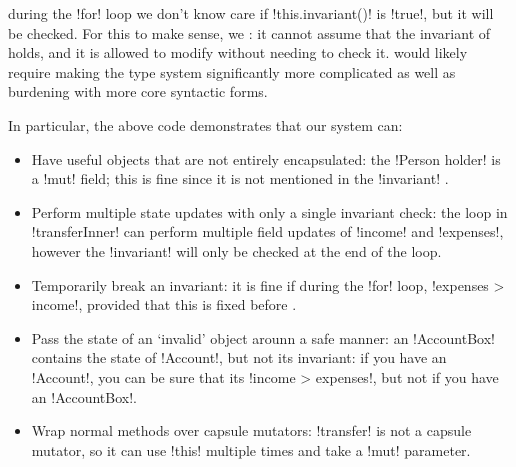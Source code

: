  during the \Q!for! loop\IO{)} we don't know  care if \Q!this.invariant()! is \Q!true!, but   it will be checked. For this to make sense, we  : it cannot assume that the invariant of   holds, and it is allowed to modify   without needing to check it.  would likely require making the type system significantly more complicated as well as burdening   with more core syntactic forms. 

 In particular, the above code demonstrates that our system can:
\SSI\begin{itemize}
\item Have useful objects that are not entirely encapsulated: the \Q!Person holder! is a \Q!mut! field; this is fine since it is not mentioned in the  \Q!invariant! .
\item Perform multiple state updates with only a single invariant check: the loop in \Q!transferInner!  can perform multiple field updates of \Q!income! and \Q!expenses!, however the \Q!invariant! will only be checked at the end of the loop.
\item Temporarily break an invariant: it is fine if during the \Q!for! loop, \Q!expenses > income!, provided that this is fixed before  .
\item Pass the state of an `invalid' object arounn a safe manner: an \Q!AccountBox! contains the state of \Q!Account!, but not its invariant: if you have an \Q!Account!, you can be sure that its \Q!income > expenses!, but not if you have an \Q!AccountBox!.
\item Wrap normal methods over capsule mutators:  \Q!transfer! is not a capsule mutator, so it can use \Q!this! multiple times and take a \Q!mut! parameter.
\end{itemize}

